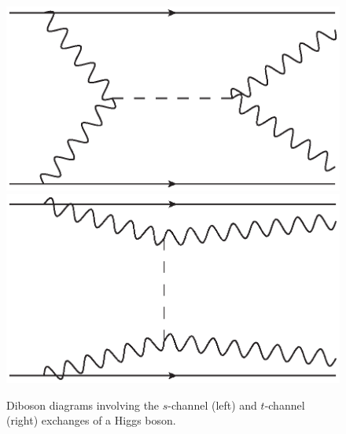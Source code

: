 \begin{figure}[htbp]
  \centering
  \includegraphics[width=.3\textwidth]{figs/theory/higgs_s}\hspace{20pt}
  \includegraphics[width=.3\textwidth]{figs/theory/higgs_t}
  \caption{Diboson diagrams involving the $s$-channel (left) and $t$-channel (right) exchanges of a Higgs boson.}
  \label{fig:theory_higgs}
\end{figure}

